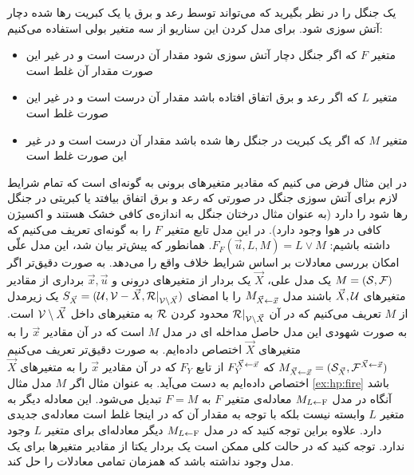 \begin{example}
      \label{ex:hp:fire}
      یک جنگل را در نظر بگیرید که می‌تواند توسط رعد و برق یا یک کبریت رها شده دچار آتش سوزی شود.
      برای مدل کردن این سناریو از سه متغیر بولی
      استفاده می‌کنیم:
      \begin{itemize}
            \item متغیر
                  $F$
                  که اگر جنگل دچار آتش سوزی شود مقدار آن درست است و در غیر این صورت مقدار آن غلط است
            \item متغیر
                  $L$
                  که اگر رعد و برق اتفاق افتاده باشد مقدار آن درست است و در غیر این صورت غلط است
            \item متغیر
                  $M$
                  که اگر یک کبریت در جنگل رها شده باشد مقدار آن درست است و در غیر این صورت غلط است
      \end{itemize}
\end{example}
در این مثال فرض می کنیم که مقادیر متغیر‌های برونی به گونه‌ای است که تمام شرایط لازم برای آتش سوزی جنگل در صورتی که رعد و برق اتفاق بیافتد یا کبریتی در جنگل رها شود را دارد
(به عنوان مثال درختان جنگل به اندازه‌ی کافی خشک هستند و اکسیژن کافی در هوا وجود دارد).
در این مدل تابع متغیر
$F$
را به گونه‌ای تعریف می‌کنیم که داشته باشیم:
$F_F(\vec u, L , M) = L \vee M$.
همانطور که پیش‌تر بیان شد، این مدل علّی امکان بررسی معادلات بر اساس شرایط خلاف واقع را می‌دهد.
به صورت دقیق‌تر اگر
$M = (\mathcal{S},\mathcal{F})$
یک مدل علی،
$\vec X$
یک بردار از متغیرهای درونی و
$\vec{x}, \vec{u}$
برداری از مقادیر متغیر‌های
$\vec{X},\mathcal{U}$
باشند
مدل
$M_{\vec{X}\leftarrow \vec{x}}$
را با امضای
$S_{\vec X}=(\mathcal{U},\mathcal{V}-\vec X,\mathcal{R}|_{\mathcal{V} \setminus \vec{X}})$
یک زیرمدل
از
$M$
تعریف می‌کنیم که در آن
$\mathcal{R}|_{\mathcal{V}\setminus \vec X}$
محدود کردن 
$\mathcal{R}$
به متغیر‌های داخل 
$\mathcal{V} \setminus \vec X$
است.
به صورت شهودی این مدل حاصل مداخله‌
ای در مدل
$M$
است که در آن مقادیر
$\vec{x}$
را به متغیر‌های
$\vec{X}$
اختصاص داده‌ایم.
به صورت دقیق‌تر تعریف می‌کنیم
$M_{\vec{X}\leftarrow\vec{x}} = (\mathcal{S}_{\vec{X}},\mathcal{F}^{\vec{X}\leftarrow\vec{x}})$
که
$F_Y^{\vec{X}\leftarrow\vec{x}}$
از تابع
$F_Y$
که در آن مقادیر
$\vec{x}$
را به متغیرهای
$\vec{X}$
اختصاص داده‌ایم به دست می‌آید.
به عنوان مثال اگر
$M$
مدل مثال
\ref{ex:hp:fire}
باشد آنگاه در مدل
$M_{L\leftarrow \mathrm{F}}$
معادله‌ی متغیر
$F$
به
$F = M$
تبدیل می‌شود.
این معادله دیگر به متغیر
$L$
وابسته نیست بلکه با توجه به مقدار آن که در اینجا غلط است معادله‌ی جدیدی دارد.
علاوه براین توجه کنید که در مدل
$M_{L\leftarrow \mathrm{F}}$
دیگر معادله‌ای برای متغیر
$L$
وجود ندارد.
توجه کنید که در حالت کلی ممکن است یک بردار یکتا از مقادیر متغیر‌ها برای یک مدل وجود نداشته باشد که همزمان تمامی معادلات را حل کند.
